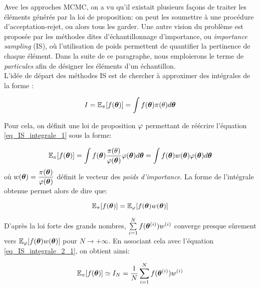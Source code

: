  Avec les approches MCMC, on a vu qu'il existait plusieurs façons de traiter les éléments générés par la loi de proposition: on peut les soumettre à une procédure d'acceptation-rejet, ou alors tous les garder. Une autre vision du problème est proposée par les méthodes dites d'échantillonnage d'importance, ou \textit{importance sampling} (IS), où l'utilisation de poids permettent de quantifier la pertinence de chaque élément. Dans la suite de ce paragraphe, nous emploierons le terme de \textit{particules} afin de désigner les éléments d'un échantillon.\\
 
 L'idée de départ des méthodes IS est de chercher à approximer des intégrales de la forme : 
 
 \begin{equation}
  I = \mathbb{E}_\pi[f({\bm{\theta}})] = \int f({\bm{\theta}})\pi(\theta)d{\bm{\theta}}
  \label{eq_IS_integrale_1}
 \end{equation}
 
 Pour cela, on définit une loi de proposition ${\varphi}$ permettant de réécrire l'équation \eqref{eq_IS_integrale_1} sous la forme:
 
 \begin{equation}
\mathbb{E}_\pi[f({\bm{\theta}})] = \int  f({\bm{\theta}}) \dfrac{\pi(\theta)}{{\varphi}({\bm{\theta}})}{\varphi}({\bm{\theta}})d{\bm{\theta}} = \int  f({\bm{\theta}}) w({\bm{\theta}}) {\varphi}({\bm{\theta}})d{\bm{\theta}} 
\label{eq_IS_integrale_2}
 \end{equation}
 où $w({\bm{\theta}}) = \dfrac{\pi({\bm{\theta}})}{{\varphi}({\bm{\theta}})}$ définit le vecteur des \textit{poids d'importance}.  La forme de l'intégrale obtenue permet alors de dire que:
 
\begin{equation}
\mathbb{E}_\pi[f({\bm{\theta}})] = \mathbb{E}_{\varphi}[f({\bm{\theta}})w({\bm{\theta}})] 
\label{eq_IS_integrale_2_1}
\end{equation}

D'après la loi forte des grands nombres, $\sum\limits_{i=1}^N f({\bm{\theta}}^{(i)}) w^{(i)}$ converge presque sûrement vers  $\mathbb{E}_\varphi[f({\bm{\theta}})w({\bm{\theta}})]$ pour $N \rightarrow + \infty$. En associant cela avec l'équation \eqref{eq_IS_integrale_2_1}, on obtient ainsi:
 
 \begin{equation}
 \mathbb{E}_\pi[f({\bm{\theta}})] \simeq I_N = \dfrac{1}{N}\sum\limits_{i=1}^N f({\bm{\theta}}^{(i)})  w^{(i)}
 \label{eq_IS_integrale_3}
 \end{equation}
 
